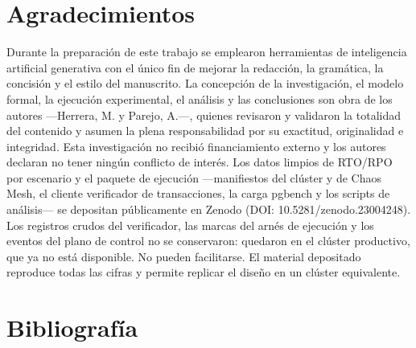 \documentclass[12pt,twocolumn,letterpaper]{article}
\begin{document}
\section*{Agradecimientos}
Durante la preparación de este trabajo se emplearon herramientas de inteligencia artificial generativa con el único fin de mejorar la redacción, la gramática, la concisión y el estilo del manuscrito. La concepción de la investigación, el modelo formal, la ejecución experimental, el análisis y las conclusiones son obra de los autores —Herrera, M. y Parejo, A.—, quienes revisaron y validaron la totalidad del contenido y asumen la plena responsabilidad por su exactitud, originalidad e integridad. Esta investigación no recibió financiamiento externo y los autores declaran no tener ningún conflicto de interés. Los datos limpios de RTO/RPO por escenario y el paquete de ejecución —manifiestos del clúster y de Chaos Mesh, el cliente verificador de transacciones, la carga pgbench y los scripts de análisis— se depositan públicamente en Zenodo (DOI: 10.5281/\allowbreak zenodo.23004248). Los registros crudos del verificador, las marcas del arnés de ejecución y los eventos del plano de control no se conservaron: quedaron en el clúster productivo, que ya no está disponible. No pueden facilitarse. El material depositado reproduce todas las cifras y permite replicar el diseño en un clúster equivalente.

\section*{Bibliografía}
\begingroup
\footnotesize
\setlength{\parindent}{-1.2em}
\setlength{\leftskip}{1.2em}
\setlength{\parskip}{4pt}
\indent
\end{document}
